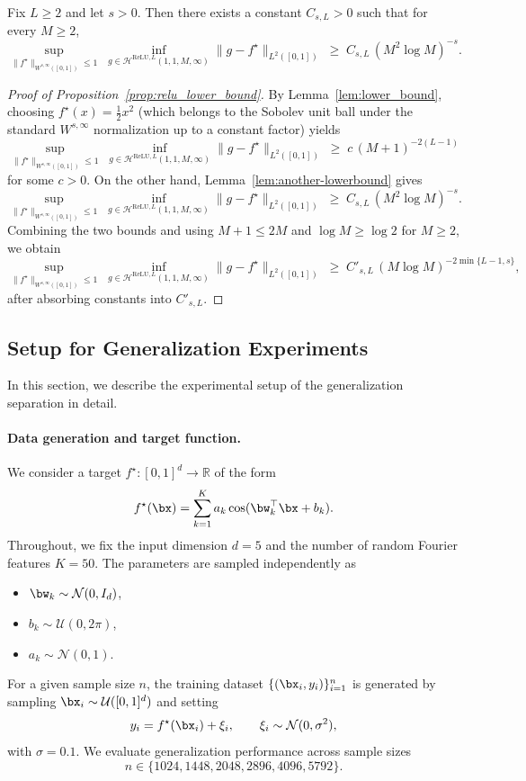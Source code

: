 \documentclass[11pt]{article}
\begin{document}
\begin{lemma}
\label{lem:another-lowerbound}
Fix $L\ge 2$ and let $s>0$. Then there exists a constant $C_{s,L}>0$ such that for every $M\ge 2$,
\[
\sup_{\|f^\star\|_{W^{s,\infty}([0,1])}\le 1}\;
\inf_{g\in \mathcal{H}^{\mathrm{ReLU},L}(1,1,M,\infty)}
\|g-f^\star\|_{L^2([0,1])}
\;\ge\;
C_{s,L}\,(M^2\log M)^{-s}.
\]
\end{lemma}

\begin{proof}[Proof of Proposition~\ref{prop:relu_lower_bound}]
By Lemma~\ref{lem:lower_bound}, choosing $f^\star(x)=\tfrac12 x^2$ (which belongs to the Sobolev
unit ball under the standard $W^{s,\infty}$ normalization up to a constant factor) yields
\[
\sup_{\|f^\star\|_{W^{s,\infty}([0,1])}\le 1}\;
\inf_{g\in \mathcal{H}^{\mathrm{ReLU},L}(1,1,M,\infty)}
\|g-f^\star\|_{L^2([0,1])}
\;\ge\;
c\,(M+1)^{-2(L-1)}
\]
for some $c>0$.
On the other hand, Lemma~\ref{lem:another-lowerbound} gives
\[
\sup_{\|f^\star\|_{W^{s,\infty}([0,1])}\le 1}\;
\inf_{g\in \mathcal{H}^{\mathrm{ReLU},L}(1,1,M,\infty)}
\|g-f^\star\|_{L^2([0,1])}
\;\ge\;
C_{s,L}\,(M^2\log M)^{-s}.
\]
Combining the two bounds and using $M+1\le 2M$ and $\log M\ge \log 2$ for $M\ge 2$, we obtain
\[
\sup_{\|f^\star\|_{W^{s,\infty}([0,1])}\le 1}\;
\inf_{g\in \mathcal{H}^{\mathrm{ReLU},L}(1,1,M,\infty)}
\|g-f^\star\|_{L^2([0,1])}
\;\ge\;
C'_{s,L}\,(M\log M)^{-2\min\{L-1,s\}},
\]
after absorbing constants into $C'_{s,L}$.
\end{proof}


\subsection{Setup for Generalization Experiments}
\label{subapp:est_lower}

In this section, we describe the experimental setup of the generalization separation in detail.

\paragraph{Data generation and target function.}
We consider a target $f^\star:[0,1]^d\to\mathbb{R}$ of the form
\[
f^\star(\bx)=\sum_{k=1}^{K} a_k \cos(\bw_k^\top \bx + b_k).
\]
Throughout, we fix the input dimension $d=5$ and the number of random Fourier features $K=50$. The parameters are sampled independently as
\begin{itemize}
    \item $\bw_k \sim \mathcal{N}(0,I_d)$,
    \item $b_k \sim \mathcal{U}(0,2\pi)$,
    \item $a_k \sim \mathcal{N}(0,1)$.
\end{itemize}
For a given sample size $n$, the training dataset $\{(\bx_i,y_i)\}_{i=1}^n$ is generated by sampling $\bx_i \sim \mathcal{U}([0,1]^d)$ and setting
\[
y_i = f^\star(\bx_i) + \xi_i,\qquad \xi_i \sim \mathcal{N}(0,\sigma^2),
\]
with $\sigma=0.1$. We evaluate generalization performance across sample sizes
\[
n \in \{1024, 1448, 2048, 2896, 4096, 5792\}.
\]
\end{document}
